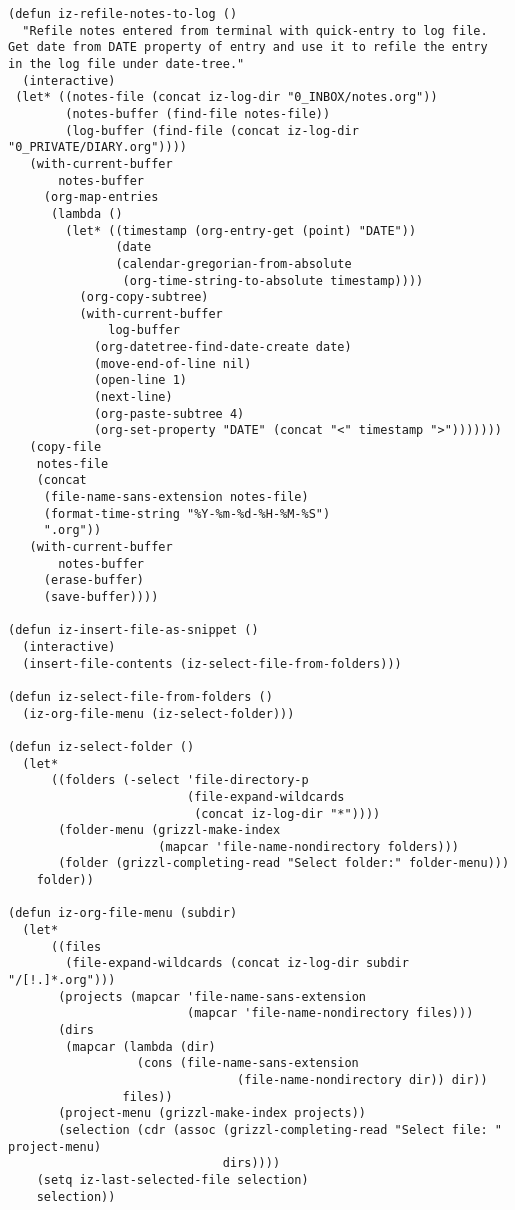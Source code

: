 \documentclass{article}
\begin{document}
\begin{verbatim}
(defun iz-refile-notes-to-log ()
  "Refile notes entered from terminal with quick-entry to log file.
Get date from DATE property of entry and use it to refile the entry
in the log file under date-tree."
  (interactive)
 (let* ((notes-file (concat iz-log-dir "0_INBOX/notes.org"))
        (notes-buffer (find-file notes-file))
        (log-buffer (find-file (concat iz-log-dir "0_PRIVATE/DIARY.org"))))
   (with-current-buffer
       notes-buffer
     (org-map-entries
      (lambda ()
        (let* ((timestamp (org-entry-get (point) "DATE"))
               (date
               (calendar-gregorian-from-absolute
                (org-time-string-to-absolute timestamp))))
          (org-copy-subtree)
          (with-current-buffer
              log-buffer
            (org-datetree-find-date-create date)
            (move-end-of-line nil)
            (open-line 1)
            (next-line)
            (org-paste-subtree 4)
            (org-set-property "DATE" (concat "<" timestamp ">")))))))
   (copy-file
    notes-file
    (concat
     (file-name-sans-extension notes-file)
     (format-time-string "%Y-%m-%d-%H-%M-%S")
     ".org"))
   (with-current-buffer
       notes-buffer
     (erase-buffer)
     (save-buffer))))

(defun iz-insert-file-as-snippet ()
  (interactive)
  (insert-file-contents (iz-select-file-from-folders)))

(defun iz-select-file-from-folders ()
  (iz-org-file-menu (iz-select-folder)))

(defun iz-select-folder ()
  (let*
      ((folders (-select 'file-directory-p
                         (file-expand-wildcards
                          (concat iz-log-dir "*"))))
       (folder-menu (grizzl-make-index
                     (mapcar 'file-name-nondirectory folders)))
       (folder (grizzl-completing-read "Select folder:" folder-menu)))
    folder))

(defun iz-org-file-menu (subdir)
  (let*
      ((files
        (file-expand-wildcards (concat iz-log-dir subdir "/[!.]*.org")))
       (projects (mapcar 'file-name-sans-extension
                         (mapcar 'file-name-nondirectory files)))
       (dirs
        (mapcar (lambda (dir)
                  (cons (file-name-sans-extension
                                (file-name-nondirectory dir)) dir))
                files))
       (project-menu (grizzl-make-index projects))
       (selection (cdr (assoc (grizzl-completing-read "Select file: " project-menu)
                              dirs))))
    (setq iz-last-selected-file selection)
    selection))


\end{verbatim}
\end{document}
